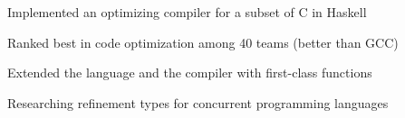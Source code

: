 \documentclass[letterpaper]{deedy-resume} %
\begin{document}
\begin{minipage}[t]{0.66\textwidth}
\sectionspace %



\begin{tightitemize}
\item Implemented an optimizing compiler for a subset of C in Haskell
\item Ranked  best in code optimization among 40 teams (better than GCC)
\item Extended the language and the compiler with first-class functions
\end{tightitemize}

\sectionspace %



\begin{tightitemize}
\item Researching refinement types for concurrent programming languages
\end{tightitemize}


\end{minipage} %
\hfill
%
%
\end{document}
